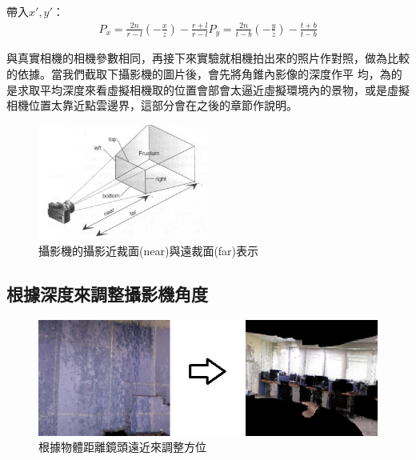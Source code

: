 	帶入$x',y'$：
	\begin{align}
		P_x = \frac{2n}{r-l} (-\frac{x}{z}) - \frac{r+l}{r-l} 		P_y = \frac{2n}{t-b} (-\frac{y}{z}) - \frac{t+b}{t-b} 
	\end{align}
	
	
	與真實相機的相機參數相同，再接下來實驗就相機拍出來的照片作對照，做為比較的依據。當我們截取下攝影機的圖片後，會先將角錐內影像的深度作平
	均，為的是求取平均深度來看虛擬相機取的位置會部會太逼近虛擬環境內的景物，或是虛擬相機位置太靠近點雲邊界，這部分會在之後的章節作說明。
	
	\begin{figure}
	\begin{center}
	  \includegraphics[width=0.5\textwidth]{figures/Camera_image.jpg}
	  \caption{攝影機的攝影近裁面(near)與遠裁面(far)表示}
	  \label{fig:glFrustum}
	\end{center}
	\end{figure}	

\subsection{根據深度來調整攝影機角度}
%

	\begin{figure}
	\begin{center}
	  \includegraphics[width=1.0\textwidth]{figures/Depth_Filter.jpg}
	  \caption{根據物體距離鏡頭遠近來調整方位}
	  \label{fig:Depth_Filter}
	\end{center}
	\end{figure}

